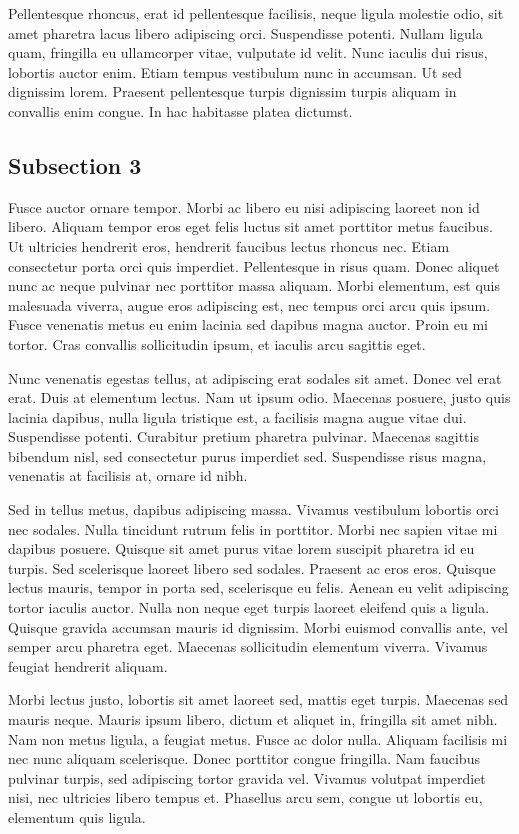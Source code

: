 Pellentesque rhoncus, erat id pellentesque facilisis, neque ligula molestie odio, sit amet pharetra lacus libero
adipiscing orci. Suspendisse potenti. Nullam ligula quam, fringilla eu ullamcorper vitae, vulputate id velit. Nunc
iaculis dui risus, lobortis auctor enim. Etiam tempus vestibulum nunc in accumsan. Ut sed dignissim lorem. Praesent
pellentesque turpis dignissim turpis aliquam in convallis enim congue. In hac habitasse platea dictumst.

\subsection{Subsection 3}
Fusce auctor ornare tempor. Morbi ac libero eu nisi adipiscing laoreet non id libero. Aliquam tempor eros eget felis
luctus sit amet porttitor metus faucibus. Ut ultricies hendrerit eros, hendrerit faucibus lectus rhoncus nec. Etiam
consectetur porta orci quis imperdiet. Pellentesque in risus quam. Donec aliquet nunc ac neque pulvinar nec porttitor
massa aliquam. Morbi elementum, est quis malesuada viverra, augue eros adipiscing est, nec tempus orci arcu quis ipsum.
Fusce venenatis metus eu enim lacinia sed dapibus magna auctor. Proin eu mi tortor. Cras convallis sollicitudin ipsum,
et iaculis arcu sagittis eget.

Nunc venenatis egestas tellus, at adipiscing erat sodales sit amet. Donec vel erat erat. Duis at elementum lectus. Nam
ut ipsum odio. Maecenas posuere, justo quis lacinia dapibus, nulla ligula tristique est, a facilisis magna augue vitae
dui. Suspendisse potenti. Curabitur pretium pharetra pulvinar. Maecenas sagittis bibendum nisl, sed consectetur purus
imperdiet sed. Suspendisse risus magna, venenatis at facilisis at, ornare id nibh.

Sed in tellus metus, dapibus adipiscing massa. Vivamus vestibulum lobortis orci nec sodales. Nulla tincidunt rutrum
felis in porttitor. Morbi nec sapien vitae mi dapibus posuere. Quisque sit amet purus vitae lorem suscipit pharetra id
eu turpis. Sed scelerisque laoreet libero sed sodales. Praesent ac eros eros. Quisque lectus mauris, tempor in porta
sed, scelerisque eu felis. Aenean eu velit adipiscing tortor iaculis auctor. Nulla non neque eget turpis laoreet
eleifend quis a ligula. Quisque gravida accumsan mauris id dignissim. Morbi euismod convallis ante, vel semper arcu
pharetra eget. Maecenas sollicitudin elementum viverra. Vivamus feugiat hendrerit aliquam.

Morbi lectus justo, lobortis sit amet laoreet sed, mattis eget turpis. Maecenas sed mauris neque. Mauris ipsum libero,
dictum et aliquet in, fringilla sit amet nibh. Nam non metus ligula, a feugiat metus. Fusce ac dolor nulla. Aliquam
facilisis mi nec nunc aliquam scelerisque. Donec porttitor congue fringilla. Nam faucibus pulvinar turpis, sed
adipiscing tortor gravida vel. Vivamus volutpat imperdiet nisi, nec ultricies libero tempus et. Phasellus arcu sem,
congue ut lobortis eu, elementum quis ligula.

